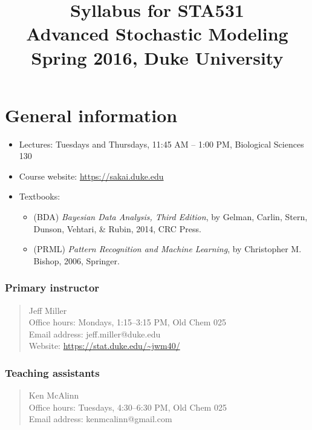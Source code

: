 \documentclass[12pt]{article}
\title{Syllabus for STA531\\
\large Advanced Stochastic Modeling\\
Spring 2016, Duke University
}
\author{}
\date{}
\begin{document}
\maketitle

\section{General information}
\begin{itemize}
\item[] Lectures: Tuesdays and Thursdays, 11:45 AM -- 1:00 PM, Biological Sciences 130
\item[] Course website: \url{https://sakai.duke.edu}
\item[] Textbooks:
    \begin{itemize}
        \item (BDA) \textit{Bayesian Data Analysis, Third Edition}, by Gelman, Carlin, Stern, Dunson, Vehtari, \& Rubin, 2014, CRC Press.
        \item (PRML) \textit{Pattern Recognition and Machine Learning}, by Christopher M. Bishop, 2006, Springer.
    \end{itemize}
\end{itemize}

\subsubsection*{Primary instructor}
\begin{quote}
Jeff Miller \\
Office hours: Mondays, 1:15--3:15 PM, Old Chem 025 \\
Email address: jeff.miller@duke.edu \\
Website: \url{https://stat.duke.edu/~jwm40/}
\end{quote}


\subsubsection*{Teaching assistants}

\begin{quote}
Ken McAlinn \\
Office hours: Tuesdays, 4:30--6:30 PM, Old Chem 025 \\
Email address:	kenmcalinn@gmail.com
\end{quote}
\end{document}

